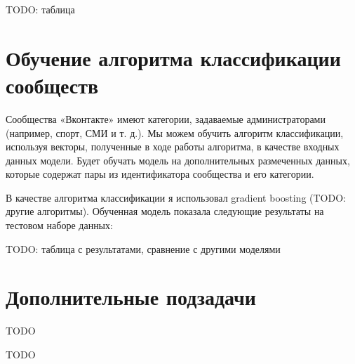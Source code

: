 \documentclass[times,specification,annotation]{itmo-student-thesis}
\begin{document}
TODO: таблица

\section{Обучение алгоритма классификации сообществ}

Сообщества «Вконтакте» имеют категории, задаваемые администраторами
(например, спорт, СМИ и т. д.). Мы можем обучить алгоритм классификации,
используя векторы, полученные в ходе работы алгоритма, в качестве входных
данных модели. Будет обучать модель на дополнительных размеченных данных,
которые содержат пары из идентификатора сообщества и его категории.

В качестве алгоритма классификации я использовал gradient boosting (TODO:
другие алгоритмы). Обученная модель показала следующие
результаты на тестовом наборе данных:

TODO: таблица с результатами, сравнение с другими моделями

\section{Дополнительные подзадачи}

TODO

\startconclusionpage

TODO

\printmainbibliography

\appendix
\end{document}
